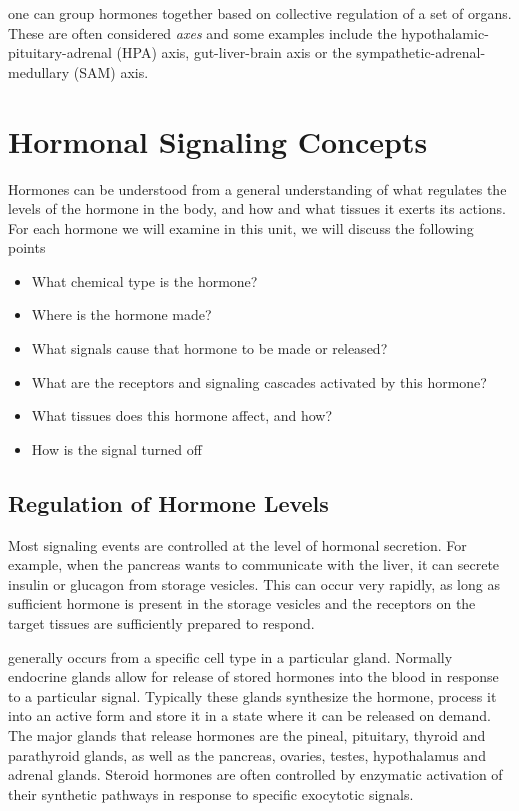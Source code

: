 \documentclass{tufte-handout}
\begin{document}
 one can group hormones together based on collective regulation  of a set of organs.  These are often considered \emph{axes} and some examples include the hypothalamic-pituitary-adrenal (HPA) axis, gut-liver-brain axis or the sympathetic-adrenal-medullary (SAM) axis. 

\section{Hormonal Signaling Concepts}

Hormones can be understood from a general understanding of what regulates the levels of the hormone in the body, and how and what tissues it exerts its actions.  For each hormone we will examine in this unit, we will discuss the following points

\begin{itemize}
\item What chemical type is the hormone?
\item Where is the hormone made?
\item What signals cause that hormone to be made or released?
\item What are the receptors and signaling cascades activated by this hormone?
\item What tissues does this hormone affect, and how?
\item How is the signal turned off
\end{itemize}

\subsection{Regulation of Hormone Levels}

Most signaling events are controlled at the level of hormonal secretion.  For example, when the pancreas wants to communicate with the liver, it can secrete insulin or glucagon from storage vesicles.  This can occur very rapidly, as long as sufficient hormone is present in the storage vesicles and the receptors on the target tissues are sufficiently prepared to respond.

 generally occurs from a specific cell type in a particular gland.  Normally endocrine glands allow for release of stored hormones into the blood in response to a particular signal.  Typically these glands synthesize the hormone, process it into an active form and store it in a state where it can be released on demand.  The major glands that release hormones are the pineal, pituitary, thyroid and parathyroid glands, as well as the pancreas, ovaries, testes, hypothalamus and adrenal glands.  Steroid hormones are often controlled by enzymatic activation of their synthetic pathways in response to specific exocytotic signals.  
\end{document}
